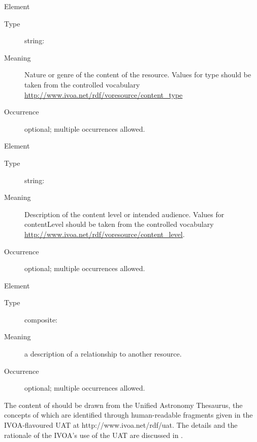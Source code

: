 \documentclass[11pt,a4paper]{ivoa}
\begin{document}
\begin{generated}
\begin{bigdescription}
\begin{description}
\end{description}
\item[Element \xmlel{type}]
\begin{description}
\item[Type] string: 
\item[Meaning]
               Nature or genre of the content of the resource.  Values for
               type should be taken from the controlled vocabulary
               \url{http://www.ivoa.net/rdf/voresource/content_type}

\item[Occurrence] optional; multiple occurrences allowed.

\end{description}
\item[Element \xmlel{contentLevel}]
\begin{description}
\item[Type] string: 
\item[Meaning]
                Description of the content level or intended audience.
                Values for contentLevel should be taken from the controlled
                vocabulary
                \url{http://www.ivoa.net/rdf/voresource/content_level}.

\item[Occurrence] optional; multiple occurrences allowed.

\end{description}
\item[Element \xmlel{relationship}]
\begin{description}
\item[Type] composite: 
\item[Meaning]
               a description of a relationship to another resource.

\item[Occurrence] optional; multiple occurrences allowed.

\end{description}


\end{bigdescription}\endgroup

\endgroup
\end{generated}


The content of  should be drawn from the Unified
Astronomy Thesaurus, the concepts of which are identified through
human-readable fragments given in the IVOA-flavoured UAT at
http://www.ivoa.net/rdf/uat.  The details and the rationale of the
IVOA's use of the UAT are discussed in \citet{2022ivoa.spec.0722D}.
\end{document}
